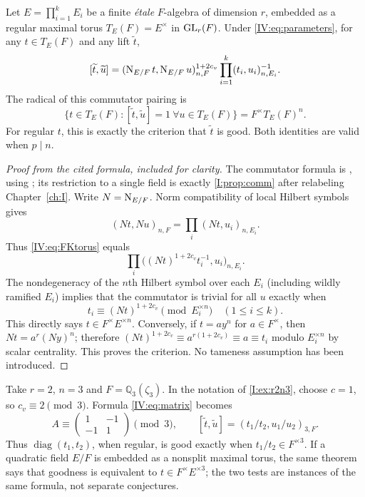 \begin{theorem}\label{IV:thm:FKgood}
Let $E=\prod_{i=1}^kE_i$ be a finite \emph{\'etale} $F$-algebra
of dimension $r$, embedded as a regular maximal torus
$T_E(F)=E^\times$ in $\operatorname{GL}_r(F)$.  Under \eqref{IV:eq:parameters},
for any $t\in T_E(F)$ and any lift $\widetilde t$,
\begin{equation}\label{IV:eq:FKtorus}
 [\widetilde t,\widetilde u]
 =(\operatorname{N}_{E/F}t,\operatorname{N}_{E/F}u)_{n,F}^{1+2c_v}
   \prod_{i=1}^k(t_i,u_i)_{n,E_i}^{-1}.
\end{equation}
The radical of this commutator pairing is
\begin{equation}\label{IV:eq:everygood}
 \{t\in T_E(F):[\widetilde t,\widetilde u]=1\ \forall u\in T_E(F)\}
 =F^\times T_E(F)^n.
\end{equation}
For regular $t$, this is exactly the criterion that $\widetilde t$
is good.  Both identities are valid when $p\mid n$.
\end{theorem}
\begin{proof}[Proof from the cited formula, included for clarity]
The commutator formula is \cite[\S3]{FK86}, using \cite[Prop.~0.1.5]{KP84};
its restriction to a single field is exactly \cref{I:prop:comm} after relabeling Chapter~\ref{ch:I}.  Write $N=\operatorname{N}_{E/F}$.
Norm compatibility of local Hilbert symbols gives
\[
 (Nt,Nu)_{n,F}
 =\prod_i(Nt,u_i)_{n,E_i}.
\]
Thus \eqref{IV:eq:FKtorus} equals
\[
 \prod_i\bigl((Nt)^{1+2c_v}t_i^{-1},u_i\bigr)_{n,E_i}.
\]
The nondegeneracy of the $n$th Hilbert symbol over each $E_i$
(including wildly ramified $E_i$) implies that the commutator is
trivial for all $u$ exactly when
\begin{equation}\label{IV:eq:pointwisegood}
 t_i\equiv(Nt)^{1+2c_v}\pmod{E_i^{\times n}}
 \quad (1\leq i\leq k).
\end{equation}
This directly says $t\in F^\times E^{\times n}$.  Conversely,
if $t=ay^n$ for $a\in F^\times$, then
$Nt=a^r(Ny)^n$; therefore
$(Nt)^{1+2c_v}\equiv a^{r(1+2c_v)}\equiv a\equiv t_i$
modulo $E_i^{\times n}$ by scalar centrality.  This proves the
criterion.  No tameness assumption has been introduced.
\end{proof}

\begin{example}\label{IV:ex:diag}
Take $r=2$, $n=3$ and $F=\mathbb Q_3(\zeta_3)$.
In the notation of \cref{I:ex:r2n3}, choose $c=1$, so
$c_v\equiv2\pmod3$.  Formula \eqref{IV:eq:matrix} becomes
\[
 A\equiv\begin{pmatrix}1&-1\\-1&1\end{pmatrix}\pmod3,
 \qquad
 [\widetilde t,\widetilde u]
 =(t_1/t_2,u_1/u_2)_{3,F}.
\]
Thus $\operatorname{diag}(t_1,t_2)$, when regular, is good exactly
when $t_1/t_2\in F^{\times3}$.  If a quadratic field $E/F$ is
embedded as a nonsplit maximal torus, the same theorem says that
goodness is equivalent to $t\in F^\times E^{\times3}$; the two
tests are instances of the same formula, not separate conjectures.
\end{example}

